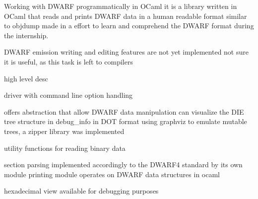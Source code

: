 Working with DWARF programmatically in OCaml
it is a library written in OCaml that reads and prints DWARF data in a human readable format similar to objdump
made in a effort to learn and comprehend the DWARF format during the internship.

DWARF emission writing and editing features are not yet implemented
not sure it is useful, as this task is left to compilers

high level desc


driver with command line option handling

offers abstraction that allow DWARF data manipulation
can visualize the DIE tree structure in debug\_info in DOT format using graphviz
to emulate mutable trees, a zipper library was implemented

utility functions for reading binary data

section parsing implemented accordingly to the DWARF4 standard by its own module
printing module operates on DWARF data structures in ocaml

hexadecimal view available for debugging purposes

